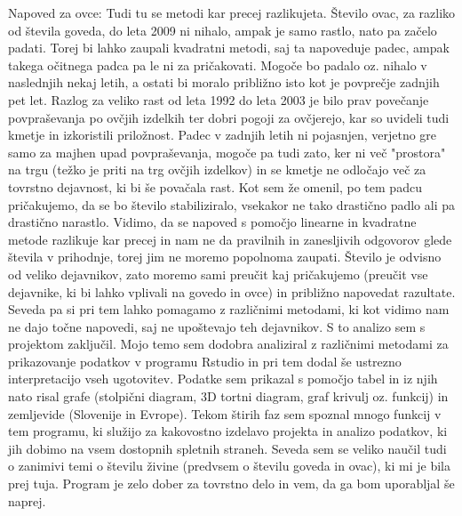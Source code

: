 \documentclass[11pt,a4paper]{article}
\begin{document}
\noindent Napoved za ovce: Tudi tu se metodi kar precej razlikujeta. Število ovac, za razliko od števila goveda, do leta 2009 ni nihalo, ampak je samo rastlo, nato pa začelo padati. Torej bi lahko zaupali kvadratni metodi, saj ta napoveduje padec, ampak takega očitnega padca pa le ni za pričakovati. Mogoče bo padalo oz. nihalo v naslednjih nekaj letih, a ostati bi moralo približno isto kot je povprečje zadnjih pet let. Razlog za veliko rast od leta 1992 do leta 2003 je bilo prav povečanje povpraševanja po ovčjih izdelkih ter dobri pogoji za ovčjerejo, kar so uvideli tudi kmetje in izkoristili priložnost. Padec v zadnjih letih ni pojasnjen, verjetno gre samo za majhen upad povpraševanja, mogoče pa tudi zato, ker ni več "prostora" na trgu (težko je priti na trg ovčjih izdelkov) in se kmetje ne odločajo več za tovrstno dejavnost, ki bi še povačala rast. Kot sem že omenil, po tem padcu pričakujemo, da se bo število stabiliziralo, vsekakor ne tako drastično padlo ali pa drastično narastlo.
\newline
Vidimo, da se napoved s pomočjo linearne in kvadratne metode razlikuje kar precej in nam ne da pravilnih in zanesljivih odgovorov glede števila v prihodnje, torej jim ne moremo popolnoma zaupati. Število je odvisno od veliko dejavnikov, zato moremo sami preučit kaj pričakujemo (preučit vse dejavnike, ki bi lahko vplivali na govedo in ovce) in približno napovedat razultate. Seveda pa si pri tem lahko pomagamo z različnimi metodami, ki kot vidimo nam ne dajo točne napovedi, saj ne upoštevajo teh dejavnikov.
\newline
\newline
S to analizo sem s projektom zaključil. Mojo temo sem dodobra analiziral z različnimi metodami za prikazovanje podatkov v programu Rstudio in pri tem dodal še ustrezno interpretacijo vseh ugotovitev. Podatke sem prikazal s pomočjo tabel in iz njih nato risal grafe (stolpični diagram, 3D tortni diagram, graf krivulj oz. funkcij) in zemljevide (Slovenije in Evrope). Tekom štirih faz sem spoznal mnogo funkcij v tem programu, ki služijo za kakovostno izdelavo projekta in analizo podatkov, ki jih dobimo na vsem dostopnih spletnih straneh. Seveda sem se veliko naučil tudi o zanimivi temi o številu živine (predvsem o številu goveda in ovac), ki mi je bila prej tuja. Program je zelo dober za tovrstno delo in vem, da ga bom uporabljal še naprej.
\end{document}

